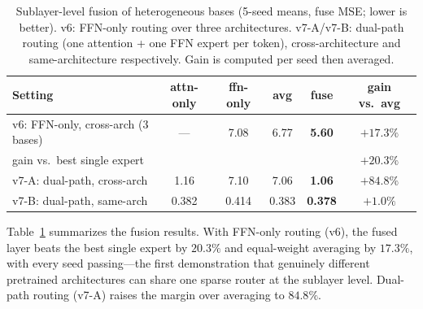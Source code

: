 \documentclass[10pt,twoside]{article}
\theoremstyle{definition}
\theoremstyle{plain}
\theoremstyle{remark}
\begin{document}
\begin{table}[htbp]
\centering
\caption{Sublayer-level fusion of heterogeneous bases (5-seed means, fuse MSE; lower is better). v6: FFN-only routing over three architectures. v7-A/v7-B: dual-path routing (one attention + one FFN expert per token), cross-architecture and same-architecture respectively. Gain is computed per seed then averaged.}
\label{tab:fusion}
\small
\setlength{\tabcolsep}{4.5pt}
\begin{tabular}{lccccc}
\toprule
\textbf{Setting} & \textbf{attn-only} & \textbf{ffn-only} & \textbf{avg} & \textbf{fuse} & \textbf{gain vs.\ avg} \\
\midrule
v6: FFN-only, cross-arch (3 bases) & --- & 7.08 & 6.77 & \textbf{5.60} & $+17.3\%$ \\
\quad gain vs.\ best single expert & & & & & $+20.3\%$ \\
v7-A: dual-path, cross-arch & 1.16 & 7.10 & 7.06 & \textbf{1.06} & $+84.8\%$ \\
v7-B: dual-path, same-arch & 0.382 & 0.414 & 0.383 & \textbf{0.378} & $+1.0\%$ \\
\bottomrule
\end{tabular}
\end{table}

Table~\ref{tab:fusion} summarizes the fusion results. With FFN-only routing (v6), the fused layer beats the best single expert by $20.3\%$ and equal-weight averaging by $17.3\%$, with every seed passing---the first demonstration that genuinely different pretrained architectures can share one sparse router at the sublayer level. Dual-path routing (v7-A) raises the margin over averaging to $84.8\%$.
\end{document}
